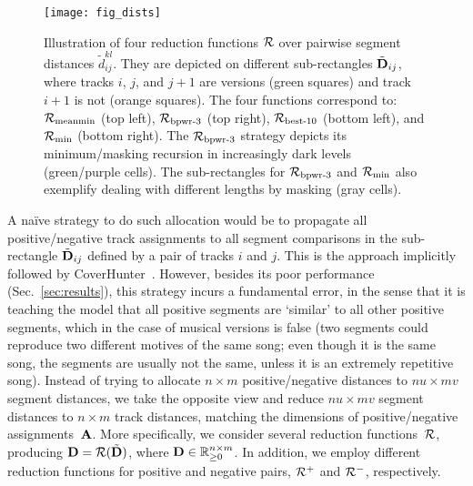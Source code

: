 \begin{figure}[t]
\centerline{\texttt{[image: fig\_dists]}}
\figurecaptionspace
\vspace{0.25cm}
\caption{
Illustration of four reduction functions $\mathcal{R}$ over pairwise segment distances $\tilde{d}^{kl}_{ij}$. They are depicted on different sub-rectangles $\tilde{\textbf{D}}_{ij}$, where tracks $i$, $j$, and $j+1$ are versions (green squares) and track $i+1$ is not (orange squares). The four functions correspond to: 
$\mathcal{R}_{\text{meanmin}}$ (top left), $\mathcal{R}_{\text{bpwr-3}}$ (top right), $\mathcal{R}_{\text{best-10}}$ (bottom left), and $\mathcal{R}_{\text{min}}$ (bottom right). The $\mathcal{R}_{\text{bpwr-3}}$ strategy depicts its minimum/masking recursion in increasingly dark levels (green/purple cells). The sub-rectangles for  $\mathcal{R}_{\text{bpwr-3}}$ and $\mathcal{R}_{\text{min}}$ also exemplify dealing with different lengths by masking (gray cells).
}
\label{fig:dists}
\end{figure}

A naïve strategy to do such allocation would be to propagate all positive/negative track assignments to all segment comparisons in the sub-rectangle $\tilde{\textbf{D}}_{ij}$ defined by a pair of tracks $i$ and $j$. This is the approach implicitly followed by CoverHunter~\cite{liu_coverhunter_2023}. However, besides its poor performance (Sec.~\ref{sec:results}), this strategy incurs a fundamental error, in the sense that it is teaching the model that all positive segments are `similar' to all other positive segments, which in the case of musical versions is false (two segments could reproduce two different motives of the same song; even though it is the same song, the segments are usually not the same, unless it is an extremely repetitive song). Instead of trying to allocate $n\times m$ positive/negative distances to $nu\times mv$ segment distances, we take the opposite view and reduce $nu\times mv$ segment distances to $n\times m$ track distances, matching the dimensions of positive/negative assignments~$\textbf{A}$. More specifically, we consider several reduction functions~$\mathcal{R}$, producing $\textbf{D} = \mathcal{R}(\tilde{\textbf{D}})$, where $\textbf{D} \in \mathbb{R}_{\ge 0}^{n\times m}$. In addition, we employ different reduction functions for positive and negative pairs, $\mathcal{R}^+$ and $\mathcal{R}^-$, respectively.

